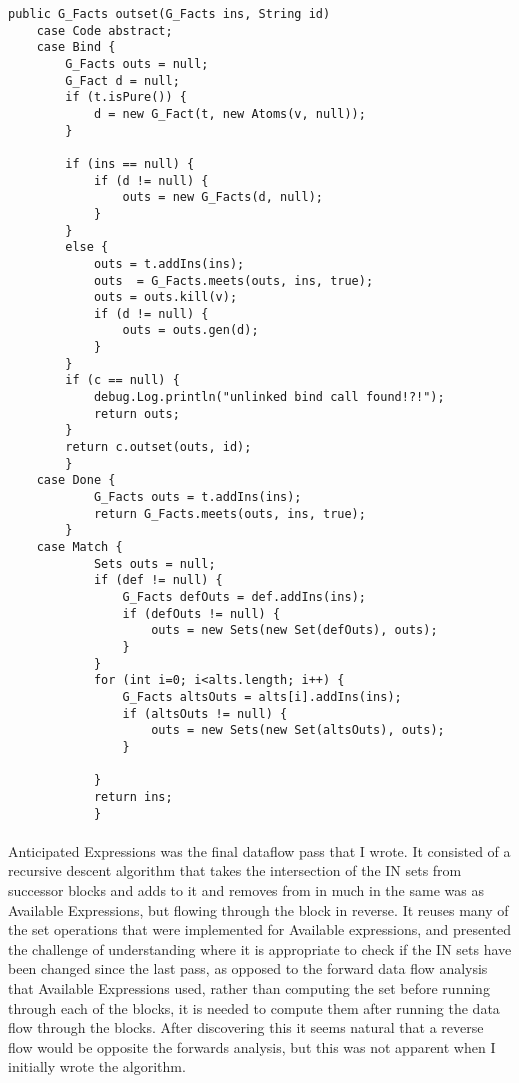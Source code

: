 \documentclass[14pt]{article}
\begin{document}
\begin{verbatim}
public G_Facts outset(G_Facts ins, String id)
    case Code abstract;
    case Bind {
        G_Facts outs = null;
        G_Fact d = null;
        if (t.isPure()) {
            d = new G_Fact(t, new Atoms(v, null));
        }

        if (ins == null) {
            if (d != null) {
                outs = new G_Facts(d, null);
            }
        }
        else {
            outs = t.addIns(ins);
            outs  = G_Facts.meets(outs, ins, true);
            outs = outs.kill(v);
            if (d != null) {
                outs = outs.gen(d);
            }
        }
        if (c == null) {
            debug.Log.println("unlinked bind call found!?!");
            return outs;
        }
        return c.outset(outs, id);
        }
    case Done { 
            G_Facts outs = t.addIns(ins);
            return G_Facts.meets(outs, ins, true);
        }
    case Match {
            Sets outs = null;
            if (def != null) {
                G_Facts defOuts = def.addIns(ins);
                if (defOuts != null) {
                    outs = new Sets(new Set(defOuts), outs);
                }
            }
            for (int i=0; i<alts.length; i++) {
                G_Facts altsOuts = alts[i].addIns(ins);
                if (altsOuts != null) {
                    outs = new Sets(new Set(altsOuts), outs);
                }
                
            }
            return ins;
            }
\end{verbatim}
\paragraph{}
Anticipated Expressions was the final dataflow pass that I wrote. It consisted of a recursive descent algorithm that takes the intersection of the IN sets from successor blocks and adds to it and removes from in much in the same was as Available Expressions, but flowing through the block in reverse. It reuses many of the set operations that were implemented for Available expressions, and presented the challenge of understanding where it is appropriate to check if the IN sets have been changed since the last pass, as opposed to the forward data flow analysis that Available Expressions used, rather than computing the set before running through each of the blocks, it is needed to compute them after running the data flow through the blocks. After discovering this it seems natural that a reverse flow would be opposite the forwards analysis, but this was not apparent when I initially wrote the algorithm.
\end{document}
